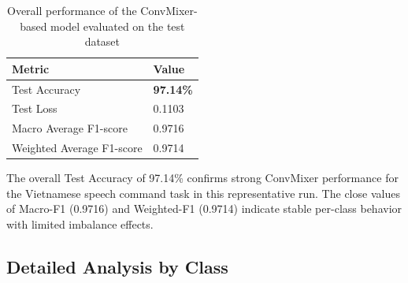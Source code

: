 \begin{table}[htbp]

\centering

\caption{\label{tab:score}Overall performance of the ConvMixer-based model evaluated on the test dataset}

\begin{tabular}{|l|l|}

\hline

\textbf{Metric} & \textbf{Value} \\

\hline

Test Accuracy & \textbf{97.14\%} \\

\hline

Test Loss & 0.1103 \\

\hline

Macro Average F1-score & 0.9716 \\

\hline

Weighted Average F1-score & 0.9714 \\

\hline

\end{tabular}

\end{table}

The overall Test Accuracy of 97.14\% confirms strong ConvMixer performance for the Vietnamese speech command task in this representative run. The close values of Macro-F1 (0.9716) and Weighted-F1 (0.9714) indicate stable per-class behavior with limited imbalance effects.

\subsection*{Detailed Analysis by Class}

